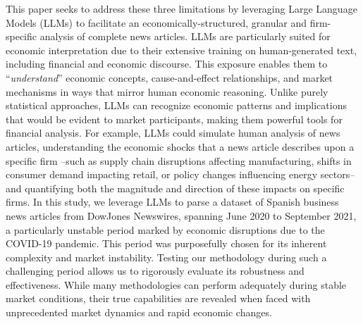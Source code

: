 \mx 
This paper seeks to address these three limitations by leveraging Large Language Models (LLMs) to facilitate an economically-structured, granular and firm-specific analysis of complete news articles. 
LLMs are particularly suited for economic interpretation due to their extensive training on human-generated text, including financial and economic discourse. This exposure enables them to ``\textit{understand}'' economic concepts, cause-and-effect relationships, and market mechanisms in ways that mirror human economic reasoning. Unlike purely statistical approaches, LLMs can recognize economic patterns and implications that would be evident to market participants, making them powerful tools for financial analysis.
For example, LLMs could simulate human analysis of news articles, understanding the economic shocks that a news article describes upon a specific firm --such as supply chain disruptions affecting manufacturing, shifts in consumer demand impacting retail, or policy changes influencing energy sectors-- and quantifying both the magnitude and direction of these impacts on specific firms. 
In this study, we leverage LLMs to parse a dataset of Spanish business news articles from DowJones Newswires, spanning June 2020 to September 2021, a particularly unstable period marked by economic disruptions due to the COVID-19 pandemic. 
This period was purposefully chosen for its inherent complexity and market instability. Testing our methodology during such a challenging period allows us to rigorously evaluate its robustness and effectiveness. While many methodologies can perform adequately during stable market conditions, their true capabilities are revealed when faced with unprecedented market dynamics and rapid economic changes.

